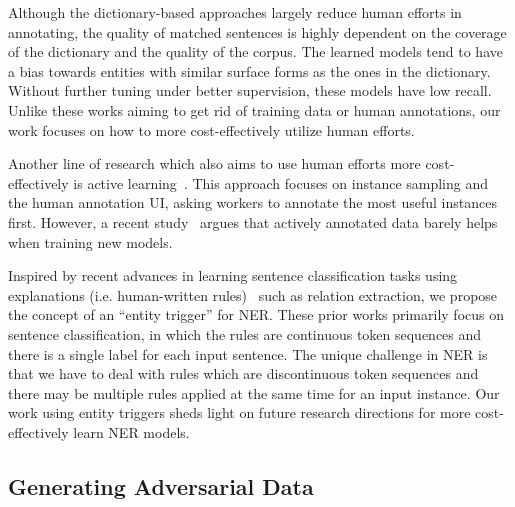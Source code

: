 Although the dictionary-based approaches largely reduce human efforts in annotating, the quality of matched sentences is highly dependent on the coverage of the dictionary and the quality of the corpus.
The learned models tend to have a bias towards entities with similar surface forms as the ones in the dictionary. Without further tuning under better supervision, these models have low recall.
Unlike these works aiming to get rid of training data or human annotations, our work focuses on how to more cost-effectively utilize human efforts.

Another line of research which also aims to use human efforts more cost-effectively is active learning~\citep{shen2018deep,Lin2019AlpacaTagAA}.
This approach focuses on instance sampling and the human annotation UI, asking workers to annotate the most useful instances first.
However, a recent study~\citep{Lipton2018PracticalOT} argues that actively annotated data barely helps when training new models. 

Inspired by recent advances in learning sentence classification tasks using explanations (i.e. human-written rules)~\citep{Li2018GeneralizeSK, Hancock2018TrainingCW, Wang2020Learning, Zhou2019NEROAN} such as relation extraction, we propose the concept of an ``entity trigger'' for NER.
These prior works primarily focus on sentence classification, in which the rules are continuous token sequences and there is a single label for each input sentence.
The unique challenge in NER is that we have to deal with rules which are discontinuous token sequences and there may be multiple rules applied at the same time for an input instance. Our work using entity triggers sheds light on future research directions for more cost-effectively learn NER models.


\subsection{Generating Adversarial Data}
\label{sec:introadv}
